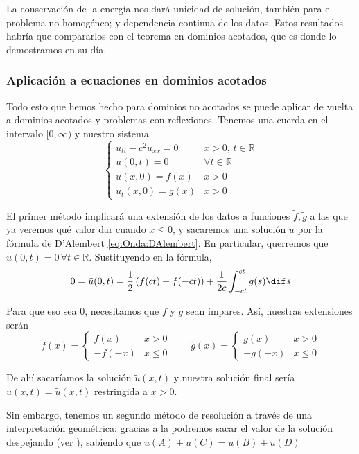 		La conservación de la energía nos dará unicidad de solución, también para el problema no homogéneo; y dependencia continua de los datos. Estos resultados habría que compararlos con el teorema en dominios acotados, que es donde lo demostramos en su día.

		\clearpage %
		\subsubsection{Aplicación a ecuaciones en dominios acotados}

		Todo esto que hemos hecho para dominios no acotados se puede aplicar de vuelta a dominios acotados y problemas con reflexiones. Tenemos una cuerda en el intervalo $[0, ∞)$ y nuestro sistema \[ \begin{cases}
		u_{tt} - c^2u_{xx} = 0 & x > 0,\, t ∈ ℝ \\
		u(0,t) = 0 & ∀ t ∈ ℝ \\
		u(x,0) = f(x) & x > 0 \\
		u_t(x,0) = g(x) & x > 0
		\end{cases}\]

		El primer método implicará una extensión de los datos a funciones $\tilde{f}, \tilde{g}$ a las que ya veremos qué valor dar cuando $x ≤ 0$, y sacaremos una solución $\tilde{u}$ por la fórmula de D'Alembert \eqref{eq:Onda:DAlembert}. En particular, querremos que $\tilde{u}(0,t) = 0\,∀t ∈ ℝ$. Sustituyendo en la fórmula, \[ 0 = \tilde{u}(0,t) = \frac{1}{2} \left(f(ct) + f(-ct)\right) + \frac{1}{2c} \int_{-ct}^{ct} g(s) \dif s \]

		Para que eso sea 0, necesitamos que $\tilde{f}$ y $\tilde{g}$ sean impares. Así, nuestras extensiones serán \[
		\tilde{f}(x) = \begin{cases}
		f(x) & x > 0 \\
		-f(-x) & x ≤ 0
		\end{cases} \qquad
		\tilde{g}(x) = \begin{cases}
		g(x) & x > 0 \\
		-g(-x) & x ≤ 0
		\end{cases}
		\]

		De ahí sacaríamos la solución $\tilde{u}(x,t)$ y nuestra solución final sería $u(x,t) = \tilde{u}(x,t)$ restringida a $x > 0$.

		Sin embargo, tenemos un segundo método de resolución a través de una interpretación geométrica: gracias a la  podremos sacar el valor de la solución despejando (ver ), sabiendo que \( u(A) + u(C) = u(B) + u(D) \label{eq:Onda:Paralelogramo} \)

